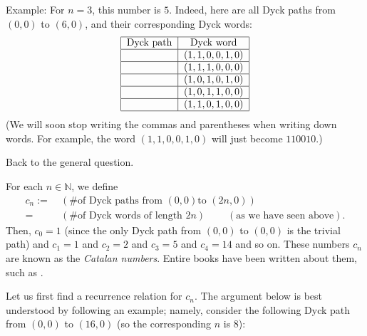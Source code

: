 Example: For $n=3$, this number is $5$. Indeed, here are all Dyck paths from
$\left(  0,0\right)  $ to $\left(  6,0\right)  $, and their corresponding Dyck
words:%
\[%
\begin{tabular}
[c]{|c|c|}\hline
Dyck path & Dyck word\\\hline
\ \
\ \  & $\left(  1,1,0,0,1,0\right)  $\\\hline
\ \
\ \  & $\left(  1,1,1,0,0,0\right)  $\\\hline
\ \
\ \  & $\left(  1,0,1,0,1,0\right)  $\\\hline
\ \
\ \  & $\left(  1,0,1,1,0,0\right)  $\\\hline
\ \
\ \  & $\left(  1,1,0,1,0,0\right)  $\\\hline
\end{tabular}
\]
(We will soon stop writing the commas and parentheses when writing down words.
For example, the word $\left(  1,1,0,0,1,0\right)  $ will just become $110010$.)

Back to the general question.

For each $n\in\mathbb{N}$, we define
\begin{align*}
c_{n}:=  &  \ \left(  \text{\# of Dyck paths from }\left(  0,0\right)  \text{
to }\left(  2n,0\right)  \right) \\
=  &  \ \left(  \text{\# of Dyck words of length }2n\right)
\ \ \ \ \ \ \ \ \ \ \left(  \text{as we have seen above}\right)  .
\end{align*}
Then, $c_{0}=1$ (since the only Dyck path from $\left(  0,0\right)  $ to
$\left(  0,0\right)  $ is the trivial path) and $c_{1}=1$ and $c_{2}=2$ and
$c_{3}=5$ and $c_{4}=14$ and so on. These numbers $c_{n}$ are known as the
\emph{Catalan numbers}. Entire books have been written about them, such as
\cite{Stanle15}.

Let us first find a recurrence relation for $c_{n}$. The argument below is
best understood by following an example; namely, consider the following Dyck
path from $\left(  0,0\right)  $ to $\left(  16,0\right)  $ (so the
corresponding $n$ is $8$):%
\[%
\]


